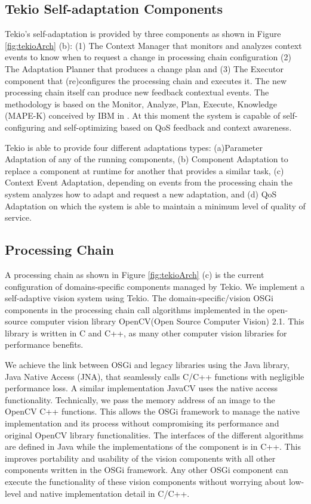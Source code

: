 \subsection{Tekio Self-adaptation Components} 
\label{sec:sec:selfTekio}

Tekio's self-adaptation is provided by three components as shown in Figure \ref{fig:tekioArch} (b):  (1) The Context Manager that monitors and analyzes context events to know when to request a change in processing chain configuration (2) The Adaptation Planner that produces a change plan and (3) The Executor component that (re)configures the processing chain  and executes it. The new processing chain itself can produce new feedback contextual events. The methodology is based on  the Monitor, Analyze, Plan, Execute, Knowledge (MAPE-K) conceived by IBM in \cite{}. At this moment the system is capable of self-configuring and self-optimizing based on QoS feedback and context awareness. 

Tekio is able to provide four different adaptations types: (a)Parameter Adaptation of any of the running components, (b) Component Adaptation to replace a component at runtime for another that provides a similar task, (c) Context Event Adaptation, depending on events from the  processing chain the system analyzes how to adapt and request a new adaptation, and (d) QoS Adaptation on which the system is able to maintain a minimum level of quality of service. 

\subsection{Processing Chain}
\label{sec:sec:chainTekio}

A processing chain as shown in Figure \ref{fig:tekioArch} (c)  is the current configuration of domains-specific components managed by Tekio. We implement a self-adaptive vision system using Tekio. The domain-specific/vision OSGi components in the processing chain call algorithms implemented in the open-source computer vision library OpenCV(Open Source Computer Vision) 2.1. This library is written in C and C++, as many other computer vision libraries for performance benefits. 

We achieve the link between OSGi and legacy libraries using the Java library, Java Native Access (JNA), that seamlessly calls C/C++ functions with negligible performance loss. 
A similar implementation  JavaCV \cite{http://code.google.com/p/javacv/} uses the native access functionality. Technically,  we pass the memory address of an image to the OpenCV C++ functions. This allows  the OSGi framework to manage the native implementation and its process without compromising its performance and original OpenCV library functionalities. The interfaces of the different algorithms are defined in Java while the implementations of the component is in C++. This improves portability and usability of the vision components with  all other components written in the OSGi framework. Any other OSGi component can execute the functionality of these vision components without worrying about low-level and native implementation detail in C/C++.

